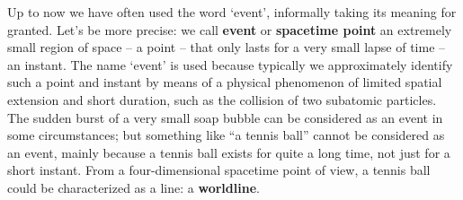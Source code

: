\documentclass[a4paper,12pt,%
onecolumn,oneside,titlepage,%
british%
]{memoir}
\renewcommand*{\|}[1][]{\nonscript\:#1\vert\nonscript\:\mathopen{}}
\begin{document}
Up to now we have often used the word \enquote*{event}, informally taking its meaning for granted. Let's be more precise: we call \textbf{event} or \textbf{spacetime point} an extremely small region of space -- a point -- that only lasts for a very small lapse of time -- an instant. The name \enquote*{event} is used because typically we approximately identify such a point and instant by means of a physical phenomenon of limited spatial extension and short duration, such as the collision of two subatomic particles. The sudden burst of a very small soap bubble can be considered as an event in some circumstances; but something like \enquote{a tennis ball} cannot be considered as an event, mainly because a tennis ball exists for quite a long time, not just for a short instant. From a four-dimensional spacetime point of view, a tennis ball could be characterized as a line: a \textbf{worldline}.
\end{document}
